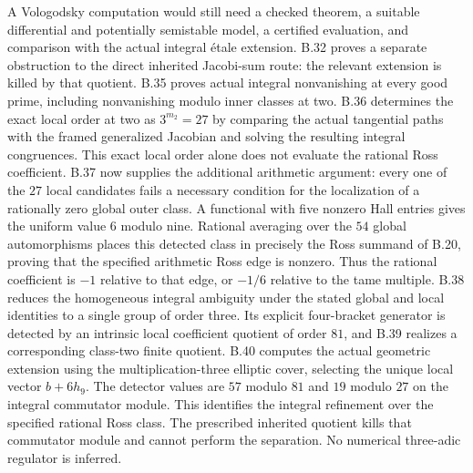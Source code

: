 A Vologodsky computation would still need a checked theorem,
a suitable differential and potentially semistable model, a
certified evaluation, and comparison with the actual integral
\'{e}tale extension.  B.32 proves a separate obstruction to the
direct inherited Jacobi-sum route: the relevant extension is
killed by that quotient. B.35 proves actual integral nonvanishing
at every good prime, including nonvanishing modulo inner classes
at two. B.36 determines the exact local order at two as $3^{m_2}=27$
by comparing the actual tangential paths with the framed generalized
Jacobian and solving the resulting integral congruences. This exact
local order alone does not evaluate the rational Ross coefficient.
B.37 now supplies the additional arithmetic argument: every one
of the $27$ local candidates fails a necessary condition for the
localization of a rationally zero global outer class. A functional
with five nonzero Hall entries gives the uniform value $6$ modulo
nine. Rational averaging over the $54$ global automorphisms places
this detected class in precisely the Ross summand of B.20, proving
that the specified arithmetic Ross edge is nonzero. Thus the
rational coefficient is $-1$ relative to that edge, or $-1/6$
relative to the tame multiple. B.38 reduces the homogeneous
integral ambiguity under the stated global and local identities
to a single group of order three. Its explicit four-bracket
generator is detected by an intrinsic local coefficient quotient
of order $81$, and B.39 realizes a corresponding class-two
finite quotient. B.40 computes the actual geometric extension
using the multiplication-three elliptic cover, selecting the
unique local vector $b+6h_9$. The detector values are $57$
modulo $81$ and $19$ modulo $27$ on the integral commutator
module. This identifies the integral refinement over the
specified rational Ross class. The prescribed inherited
quotient kills that commutator module and cannot perform
the separation. No numerical three-adic regulator is inferred.

